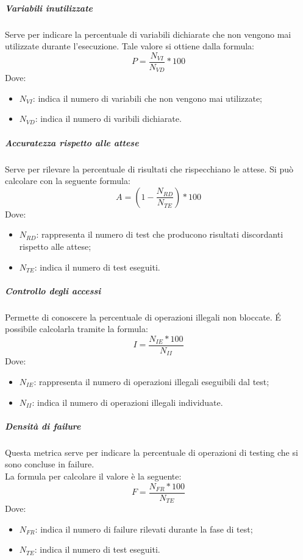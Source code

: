 \documentclass[../NormeDiProgetto_v4.0.0.tex]{subfiles}
\begin{document}
			\subparagraph{Variabili inutilizzate}
				Serve per indicare la percentuale di variabili dichiarate che non vengono mai utilizzate durante l'esecuzione.
				Tale valore si ottiene dalla formula:
				\begin{equation*}
					P = \frac{N_{VI}}{N_{VD}} * 100
				\end{equation*}
				Dove:
				\begin{itemize}
					\item \textbf{$N_{VI}$}: indica il numero di variabili che non vengono mai utilizzate;
					\item \textbf{$N_{VD}$}: indica il numero di varibili dichiarate.
				\end{itemize}
			

			\subparagraph{Accuratezza rispetto alle attese}
				Serve per rilevare la percentuale di risultati che rispecchiano le attese.
				Si può calcolare con la seguente formula:
				\begin{equation*}
					A = (1 - \frac{N_{RD}}{N_{TE}})*100
				\end{equation*}
				Dove:
				\begin{itemize}
					\item \textbf{$N_{RD}$}: rappresenta il numero di test che producono risultati discordanti rispetto alle attese;
					\item \textbf{$N_{TE}$}: indica il numero di test eseguiti.
				\end{itemize}
				

			\subparagraph{Controllo degli accessi}
				Permette di conoscere la percentuale di operazioni illegali non bloccate.
				É possibile calcolarla tramite la formula:
				\begin{equation*}
					I = \frac{N_{IE} * 100}{N_{II}}
				\end{equation*}
				Dove:
				\begin{itemize}
					\item \textbf{$N_{IE}$}: rappresenta il numero di operazioni illegali eseguibili dal test;
					\item \textbf{$N_{II}$}: indica il numero di operazioni illegali individuate.
				\end{itemize}
				
			\subparagraph{Densità di failure}
				Questa metrica serve per indicare la percentuale di operazioni di testing che si sono concluse in failure. \\La formula per calcolare il valore è la seguente:
				\begin{equation*}
					F = \frac{N_{FR} * 100}{N_{TE}}
				\end{equation*}
				Dove:
				\begin{itemize}
					\item \textbf{$N_{FR}$}: indica il numero di failure rilevati durante la fase di test;
					\item \textbf{$N_{TE}$}: indica il numero di test eseguiti.
				\end{itemize}
				
\end{document}
